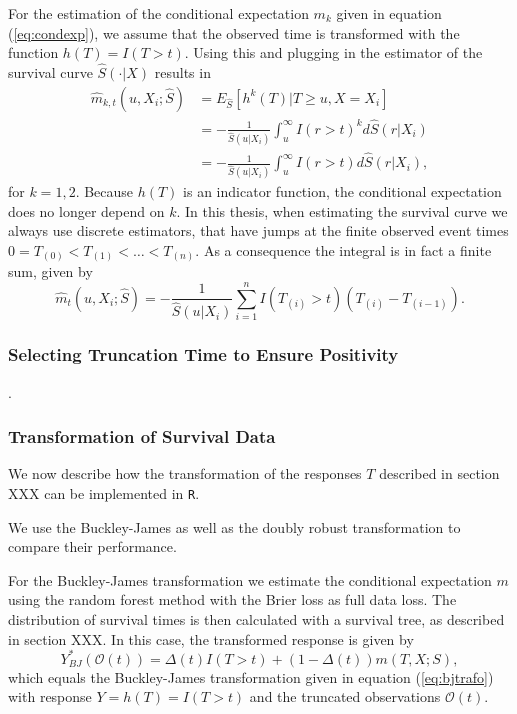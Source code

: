 \documentclass[12pt, a4paper]{article}
\theoremstyle{definition}
\theoremstyle{plain}
\numberwithin{equation}{section}
\numberwithin{figure}{section}
\numberwithin{table}{section}
\begin{document}
	For the estimation of the conditional expectation $m_k$ given in equation (\ref{eq:condexp}), we assume that the observed time is transformed with the function $h(T) = I(T>t)$.
	Using this and plugging in the estimator of the survival curve $\hat{S}(\cdot\vert X)$ results in
	\begin{equation*}
	\begin{split}
	\hat{m}_{k,t} (u, X_i; \hat{S}) &= E_{\hat{S}}[h^k(T)\vert T \geq u, X=X_i]\\
	&=-\frac{1}{\hat{S}(u\vert X_i)}\int_u^{\infty}I(r> t)^kd\hat{S}(r\vert X_i)\\
	&=-\frac{1}{\hat{S}(u\vert X_i)}\int_u^{\infty}I(r> t)d\hat{S}(r\vert X_i),
	\end{split}
	\end{equation*}
	for $k=1,2$.
	Because $h(T)$ is an indicator function, the conditional expectation does no longer depend on $k$.
	In this thesis, when estimating the survival curve we always use discrete estimators, that have jumps at the finite observed event times $0=T_{(0)}<T_{(1)}<\dots<T_{(n)}$.
	As a consequence the integral is in fact a finite sum, given by
	\begin{equation*}
	\hat{m}_t (u, X_i; \hat{S}) = -\frac{1}{\hat{S}(u\vert X_i)}\sum_{i=1}^n I(T_{(i)}>t)(T_{(i)}-T_{(i-1)}).
	\end{equation*}
	
	
	\subsubsection{Selecting Truncation Time to Ensure Positivity}
	
	\citet*{drtrees}.
	
	\subsubsection{Transformation of Survival Data}
	
	We now describe how the transformation of the responses $T$ described in section XXX can be implemented in \texttt{R}.
	
	We use the Buckley-James as well as the doubly robust transformation to compare their performance.
	
	For the Buckley-James transformation we estimate the conditional expectation $m$ using the random forest method with the Brier loss as full data loss.
	The distribution of survival times is then calculated with a survival tree, as described in section XXX.
	In this case, the transformed response is given by
	\begin{equation*}
	Y^*_{BJ}(\mathcal{O}(t)) = \Delta(t)I(T>t)+ (1-\Delta(t))m(T, X; S),
	\end{equation*}
	which equals the Buckley-James transformation given in equation (\ref{eq:bjtrafo}) with response $Y=h(T)=I(T>t)$ and the truncated observations $\mathcal{O}(t)$.
	
\end{document}
